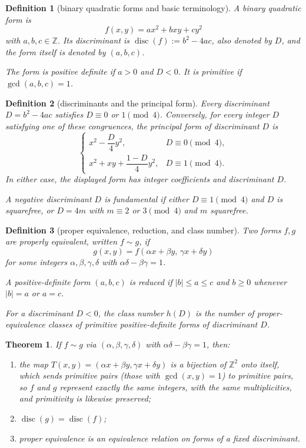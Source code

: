 \documentclass[11pt]{article}
\theoremstyle{ntstyle}
\newtheorem{theorem}{Theorem}[subsection]
\newtheorem{definition}{Definition}[subsection]
\DeclareMathOperator{\disc}{disc}
\begin{document}
\begin{definition}[binary quadratic forms and basic terminology]\label{def:8.6.1}
	A binary quadratic form is
	\[
		f(x,y)=ax^2+bxy+cy^2
	\]
	with $a,b,c\in\mathbb{Z}$. Its discriminant is
	$\disc(f):=b^2-4ac$, also denoted by $D$, and the form itself is
	denoted by $(a,b,c)$.

	The form is positive definite if $a>0$ and $D<0$. It is primitive if
	$\gcd(a,b,c)=1$.

\end{definition}
\begin{definition}[discriminants and the principal form]\label{def:8.6.2}
	Every discriminant $D=b^2-4ac$ satisfies
	$D\equiv0$ or $1\pmod{4}$. Conversely, for every integer $D$ satisfying
	one of these congruences, the principal form of discriminant $D$ is
	\[
		\begin{cases}
			x^2-\dfrac{D}{4}y^2,
				& D\equiv0\pmod{4},\\[4pt]
			x^2+xy+\dfrac{1-D}{4}y^2,
				& D\equiv1\pmod{4}.
		\end{cases}
	\]
	In either case, the displayed form has integer coefficients and
	discriminant $D$.

	A negative discriminant $D$ is fundamental if either
	$D\equiv1\pmod{4}$ and $D$ is squarefree, or $D=4m$ with
	$m\equiv2$ or $3\pmod{4}$ and $m$ squarefree.

\end{definition}
\begin{definition}[proper equivalence, reduction, and class number]\label{def:8.6.3}
	Two forms $f,g$ are properly equivalent, written $f\sim g$, if
	\[
		g(x,y)=f(\alpha x+\beta y,\,\gamma x+\delta y)
	\]
	for some integers $\alpha,\beta,\gamma,\delta$ with
	$\alpha\delta-\beta\gamma=1$.

	A positive-definite form $(a,b,c)$ is reduced if
	$|b|\le a\le c$ and $b\ge0$ whenever $|b|=a$ or $a=c$.

	For a discriminant $D<0$, the class number $h(D)$ is the number of
	proper-equivalence classes of primitive positive-definite forms of
	discriminant $D$.

\end{definition}
\begin{theorem}\label{thm:8.6.1} If $f\sim g$ via
	$(\alpha,\beta,\gamma,\delta)$ with
	$\alpha\delta-\beta\gamma=1$, then:
	\begin{enumerate}[label={\alph*)}]
		\item the map $T(x,y)=(\alpha x+\beta y,\gamma x+\delta y)$ is a
		      bijection of $\mathbb{Z}^2$ onto itself, which sends primitive
		      pairs (those with $\gcd(x, y)=1$) to primitive pairs, so $f$ and
		      $g$ represent exactly the same integers, with the same
		      multiplicities, and primitivity is likewise preserved;
		\item $\disc(g)=\disc(f)$;
		\item proper equivalence is an equivalence relation on forms of a
		      fixed discriminant.
	\end{enumerate}

\end{theorem}
\end{document}
